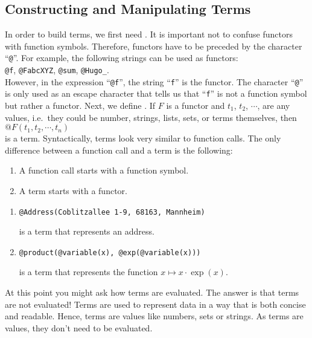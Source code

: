 \subsection{Constructing and Manipulating Terms}
In order to build terms, we first need \colorbox{amethyst}{}.  It is important not to confuse functors with
function symbols.  Therefore, functors have to be preceded by the character  
``\texttt{@}''.
For example, the following strings can be used as functors:
\\[0.2cm]
\hspace*{1.3cm}
\texttt{@f}, \quad \texttt{@FabcXYZ}, \quad \texttt{@sum}, \quad \texttt{@Hugo\_}.
\\[0.2cm]
However, in the expression ``\texttt{@f}'', the string ``\texttt{f}'' is the functor.  The
character ``\texttt{@}'' is only used as an escape character that tells us that ``\texttt{f}'' is
not a function symbol but rather a functor.  Next, we define \colorbox{amethyst}{}.  If $F$ is a functor and 
$t_1$, $t_2$, $\cdots$, are any values, i.e.~they could be number, strings, lists, sets, or terms
themselves, then
\\[0.2cm]
\hspace*{1.3cm}
$\texttt{@}F(t_1, t_2, \cdots, t_n)$
\\[0.2cm]
is a term.  Syntactically, terms look very similar to function calls.  The only difference between a function call
and a term is the following: 
\begin{enumerate}
\item A function call starts with a function symbol. 
\item A term starts with a functor. 
\end{enumerate}


\examplesEng
\begin{enumerate}
\item \texttt{@Address(Coblitzallee 1-9, 68163, Mannheim)}

      is a term that represents an address.
\item \texttt{@product(@variable(x), @exp(@variable(x)))}

      is a term that represents the  function $x \mapsto x \cdot \exp(x)$.  
      \eox
\end{enumerate}
At this point you might ask how terms are evaluated.  The answer is that terms
\colorbox{amethyst}{are not evaluated!}  
Terms are used to represent data in a way that is both concise and readable.  Hence, terms are values like
numbers, sets or strings.  As terms are values, they don't need to be evaluated.

